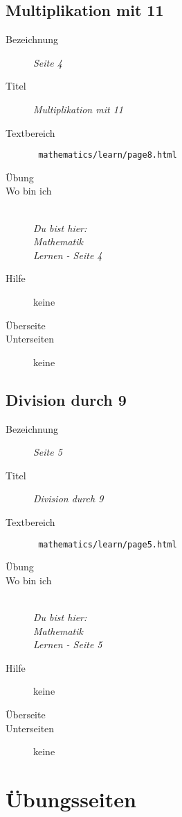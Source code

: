 \subsection{ Multiplikation mit 11 }
\label{cha:math-learn-page4}
\begin{description}
  \item[Bezeichnung] \emph{ Seite 4 }
  \item[Titel] \emph{ Multiplikation mit 11 }
  \item[Textbereich] \texttt{ mathematics/learn/page8.html }
  \item[Übung] 
  \item[Wo bin ich] \emph{\\Du bist hier:\\Mathematik\\Lernen - Seite 4 }
  \item[Hilfe] keine
  \item[Überseite] 
  \item[Unterseiten] keine
\end{description}


\subsection{ Division durch 9 }
\label{cha:math-learn-page5}
\begin{description}
  \item[Bezeichnung] \emph{ Seite 5 }
  \item[Titel] \emph{ Division durch 9 }
  \item[Textbereich] \texttt{ mathematics/learn/page5.html }
  \item[Übung] 
  \item[Wo bin ich] \emph{\\Du bist hier:\\Mathematik\\Lernen - Seite 5 }
  \item[Hilfe] keine
  \item[Überseite] 
  \item[Unterseiten] keine
\end{description}




\section{ Übungsseiten }
\label{cha:math-practise}

